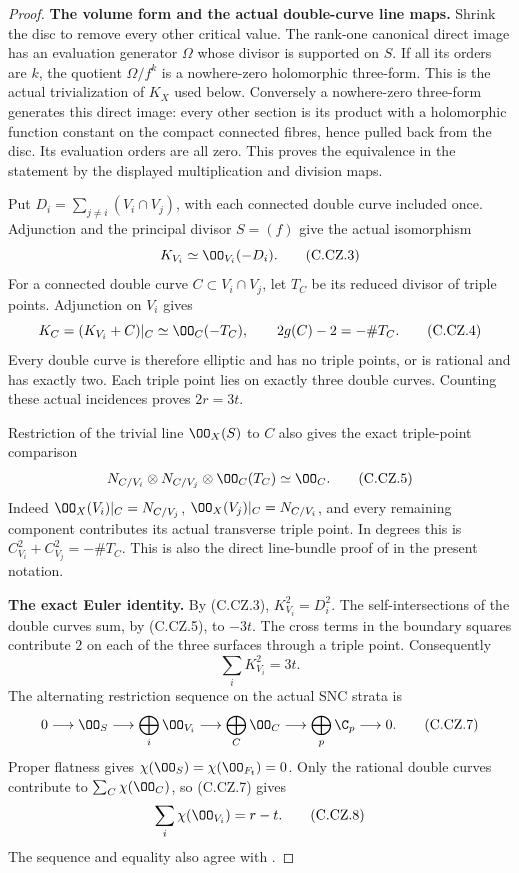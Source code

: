 \begin{proof}
\par\medskip\noindent\textbf{The volume form and the actual double-curve line maps.}
Shrink the disc to remove every other critical value.
The rank-one canonical direct image has an evaluation
generator $\Omega$ whose divisor is supported on $S$.
If all its orders are $k$, the quotient
$\Omega/f^k$ is a nowhere-zero holomorphic three-form.
This is the actual trivialization of $K_X$ used below.
Conversely a nowhere-zero three-form generates this
direct image: every other section is its product with
a holomorphic function constant on the compact connected
fibres, hence pulled back from the disc. Its evaluation
orders are all zero. This proves the equivalence in the
statement by the displayed multiplication and division maps.

Put $D_i=\sum_{j\ne i}(V_i\cap V_j)$, with each connected
double curve included once. Adjunction and the principal
divisor $S=(f)$ give the actual isomorphism
\[
                           K_{V_i}\simeq\OO_{V_i}(-D_i).
\tag{C.CZ.3}
\]
For a connected double curve $C\subset V_i\cap V_j$,
let $T_C$ be its reduced divisor of triple points.
Adjunction on $V_i$ gives
\[
             K_C=(K_{V_i}+C)|_C\simeq\OO_C(-T_C),
             \qquad 2g(C)-2=-\#T_C.
\tag{C.CZ.4}
\]
Every double curve is therefore elliptic and has no
triple points, or is rational and has exactly two.
Each triple point lies on exactly three double curves.
Counting these actual incidences proves $2r=3t$.

Restriction of the trivial line $\OO_X(S)$ to $C$
also gives the exact triple-point comparison
\[
 N_{C/V_i}\otimes N_{C/V_j}\otimes\OO_C(T_C)
                                  \simeq\OO_C.
\tag{C.CZ.5}
\]
Indeed $\OO_X(V_i)|_C=N_{C/V_j}$,
$\OO_X(V_j)|_C=N_{C/V_i}$, and every remaining
component contributes its actual transverse triple
point. In degrees this is
$C_{V_i}^2+C_{V_j}^2=-\#T_C$.
This is also the direct line-bundle proof of
\cite[Lemma 2.1]{Kulikov1977} in the present notation.

\par\medskip\noindent\textbf{The exact Euler identity.}
By (C.CZ.3), $K_{V_i}^2=D_i^2$.
The self-intersections of the double curves sum,
by (C.CZ.5), to $-3t$. The cross terms in the
boundary squares contribute $2$ on each of the
three surfaces through a triple point. Consequently
\[
                         \sum_iK_{V_i}^2=3t.
\tag{C.CZ.6}
\]
The alternating restriction sequence on the actual
SNC strata is
\[
 0\longrightarrow\OO_S\longrightarrow\bigoplus_i\OO_{V_i}
  \longrightarrow\bigoplus_C\OO_C
  \longrightarrow\bigoplus_p\C_p\longrightarrow0.
\tag{C.CZ.7}
\]
Proper flatness gives $\chi(\OO_S)=\chi(\OO_{F_t})=0$.
Only the rational double curves contribute to
$\sum_C\chi(\OO_C)$, so (C.CZ.7) gives
\[
                         \sum_i\chi(\OO_{V_i})=r-t.
\tag{C.CZ.8}
\]
The sequence and equality also agree with
\cite[Lemma 2.2]{Kulikov1977}.


\end{proof}
